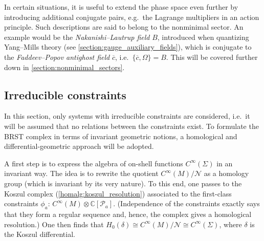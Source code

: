     \begin{remark}
        In certain situations, it is useful to extend the phase space even further by introducing additional conjugate pairs, e.g.~the Lagrange multipliers in an action principle. Such descriptions are said to belong to the nonminimal sector. An example would be the \textit{Nakanishi--Lautrup field} $B$, introduced when quantizing Yang--Mills theory (see \cref{section:gauge_auxiliary_fields}), which is conjugate to the \textit{Faddeev--Popov antighost field} $\overline{c}$, i.e.~$\{\overline{c},\Omega\}=B$. This will be covered further down in \cref{section:nonminimal_sectors}.
    \end{remark}

\subsection{Irreducible constraints}\label{section:irreducible_constraints}

    In this section, only systems with irreducible constraints are considered, i.e.~it will be assumed that no relations between the constraints exist. To formulate the BRST complex in terms of invariant geometric notions, a homological and differential-geometric approach will be adopted.

    A first step is to express the algebra of on-shell functions $C^\infty(\Sigma)$ in an invariant way. The idea is to rewrite the quotient $C^\infty(M)/\mathcal{N}$ as a homology group (which is invariant by its very nature). To this end, one passes to the Koszul complex (\cref{homalg:koszul_resolution}) associated to the first-class constraints $\phi_a$: $C^\infty(M)\otimes\mathbb{C}[\mathcal{P}_a]$. (Independence of the constraints exactly says that they form a regular sequence and, hence, the complex gives a homological resolution.) One then finds that $H_0(\delta)\cong C^\infty(M)/\mathcal{N}\cong C^\infty(\Sigma)$, where $\delta$ is the Koszul differential.

